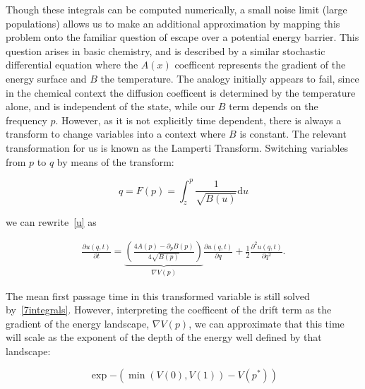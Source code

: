 \documentclass[authoryear,review,11pt]{elsarticle}
\newcommand{\ud}{\mathrm{d}}
\begin{document}
Though these integrals can be computed numerically, a small noise limit (large populations) allows us to make an additional approximation by mapping this problem onto the familiar question of escape over a potential energy barrier.  This question arises in basic chemistry, and is described by a similar stochastic differential equation where the $A(x)$ coefficent represents the gradient of the energy surface and $B$ the temperature.  The analogy initially appears to fail, since in the chemical context the diffusion coefficent is determined by the temperature alone, and is independent of the state, while our $B$ term depends on the frequency $p$.  However, as it is not explicitly time dependent, there is always a transform to change variables into a context where $B$ is constant.  The relevant transformation for us is known as the Lamperti Transform.  Switching variables from $p$ to $q$ by means of the transform:

\begin{equation}
q = F(p) = \int_z^{p} \frac{1}{\sqrt{B(u)}} \ud u
\label{p_to_q}
\end{equation}

we can rewrite~\eqref{u} as

\begin{align}
\frac{\partial u(q,t)}{\partial t} = \underbrace{\left(\frac{4 A(p)- \partial_p B(p) }{4\sqrt{B(p)}}  \right)}_{\nabla V(p)} \frac{\partial u(q,t)}{\partial q} + \frac{1}{2} \frac{\partial^2 u(q,t)}{\partial q^2}.
\label{new_u}
\end{align}

The mean first passage time in this transformed variable is still solved by~\eqref{7integrals}.  However, interpreting the coefficent of the drift term as the gradient of the energy landscape, $\nabla V(p)$, we can approximate that this time will scale as the exponent of the depth of the energy well defined by that landscape:

\begin{equation}
\exp{- (\min(V(0), V(1)) - V(p^*) )}
\end{equation}
\end{document}
